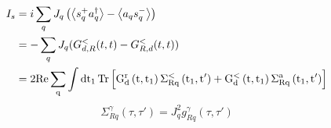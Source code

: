 \documentclass[11pt,a4paper]{article}
\begin{document}
\begin{equation}
\begin{split}
I_{s}&= i \sum_{q} J_{q}\left(\left\langle s_{q}^{+} a_{q}^{\dagger}\right\rangle-\left\langle a_{q} s_{q}^{-}\right\rangle\right) \\
&=-\sum_{q}J_{q}(G_{d,R}^{<}(t,t)-G_{R,d}^{<}(t,t)) \\
&=2\rm{Re}\sum_{q} \int  d t_{1}\operatorname{Tr}\left[G_{d}^{r}\left(t, t_{1}\right) \Sigma_{Rq}^{<}\left(t_{1}, t^{\prime}\right)+G_{d}^{<}\left(t, t_{1}\right) \Sigma_{Rq}^{a}\left(t_{1}, t^{\prime}\right)\right]
\end{split}
\end{equation}
\begin{equation}
\Sigma_{Rq}^{\gamma}(\tau, \tau')=J_{q}^{2}g_{Rq}^{\gamma}(\tau, \tau')
\end{equation}
\end{document}
